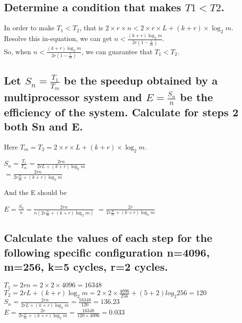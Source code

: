 \documentclass[12pt, a4paper]{report}
\begin{document}
\subsection{Determine a condition that makes $T1 < T2$.}
In order to make $T_{1} < T_{2}$, that is $2 \times r \times n < 2 \times r \times L + (k+r) \times \log_{2} m$. \\
Resolve this in-equation, we can get $n < \frac {(k+r) \log_{2} m} {2r (1 - \frac {1} {m})}$. \\
So, when $n < \frac {(k+r) \log_{2} m} {2r (1 - \frac {1} {m})}$, we can guarantee that $T_{1} < T_{2}$.

\subsection{Let $S_{n}=\frac {T_{1}} {T_{m}}$ be the speedup obtained by a multiprocessor system and $E= \frac {S_{n}} {n}$ be the efficiency of the system. Calculate for steps 2 both Sn and E.}
Here $T_{m} = T_{2} = 2 \times r \times L + (k+r) \times \log_{2} m$. \\
\begin{center}
$S_{n} = \frac {T_{1}} {T_{m}} = \frac {2rn} {2rL + (k+r) \log_{2} m}$ \\
$ = \frac {2rn} {2r \frac {n} {m} + (k+r) \log_{2} m}$
\end{center}

And the E should be 
\begin{center}
$E = \frac {S_{n}} {n} = \frac {2rn} {n(2r \frac {n} {m} + (k+r) \log_{2} m)}$
$ =  \frac {2r} {2r \frac {n} {m} + (k+r) \log_{2} m}$
\end{center}

\subsection{Calculate the values of each step for the following specific configuration  n=4096, m=256, k=5 cycles, r=2 cycles.}

$T_{1} = 2rn = 2 \times 2 \times 4096 = 16348$ \\
$T_{2} = 2rL + (k+r) \log_{2} m = 2 \times 2 \times \frac {4096} {256} + (5+2) log_{2} 256 = 120$ \\
$S_{n} = \frac {2rn} {2rL + (k+r) \log_{2} m} = \frac {16348} {120} = 136.23$ \\
$E = \frac {2r} {2r \frac {n} {m} + (k+r) \log_{2} m} = \frac {16348} {120 \times 4096} = 0.033$
\end{document}
